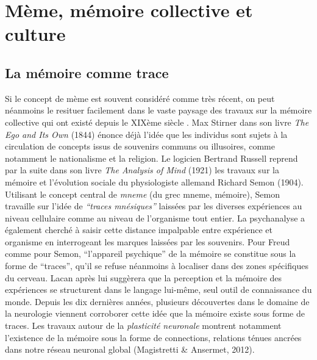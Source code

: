 \section[M\`eme, m\'emoire collective et culture]{M\`eme, m\'emoire collective et culture}
\subsection[La m\'emoire comme trace]{La m\'emoire comme trace}

Si le concept de m\`eme est souvent consid\'er\'e comme tr\`es r\'ecent, on peut n\'eanmoins le resituer facilement dans le vaste paysage des travaux sur la m\'emoire collective qui ont exist\'e depuis le XIX\`eme si\`ecle \cite{Laurent1999}. Max Stirner dans son livre \textit{The Ego and Its Own }(1844) \'enonce d\'ej\`a l{\textquoteright}id\'ee que les individus sont sujets \`a la circulation de concepts issus de souvenirs communs ou illusoires, comme notamment le nationalisme et la religion. Le logicien Bertrand Russell reprend par la suite dans son livre \textit{The Analysis of Mind }(1921) les travaux sur la m\'emoire et l{\textquoteright}\'evolution sociale du physiologiste allemand Richard Semon (1904). Utilisant le concept central de \textit{mneme} (du grec 
mneme, m\'emoire), Semon travaille sur l{\textquoteright}id\'ee de \textit{{\textquotedblleft}traces mn\'esiques{\textquotedblright} }laiss\'ees par les diverses exp\'eriences au niveau cellulaire comme au niveau de l{\textquoteright}organisme tout entier. La psychanalyse a \'egalement cherch\'e \`a saisir cette distance impalpable entre exp\'erience et organisme en interrogeant les marques laiss\'ees par les souvenirs. Pour Freud comme pour Semon, {\textquotedblleft}l{\textquoteright}appareil psychique{\textquotedblright} de la m\'emoire se constitue sous la forme de {\textquotedblleft}traces{\textquotedblright}, qu{\textquoteright}il se refuse n\'eanmoins \`a localiser dans des zones sp\'ecifiques du cerveau. Lacan apr\`es lui sugg\`erera que la perception et la m\'emoire des exp\'eriences se structurent dans le langage lui-m\^eme, seul outil de connaissance du monde. Depuis les dix derni\`eres ann\'ees, plusieurs d\'ecouvertes dans le domaine de la neurologie viennent corroborer cette id\'ee que la m\'emoire existe sous forme de traces. Les travaux autour de la \textit{plasticit\'e neuronale }montrent notamment l{\textquoteright}existence de la m\'emoire sous la forme de connections, relations t\'enues ancr\'ees dans notre r\'eseau neuronal global (Magistretti \& Ansermet, 2012).  

